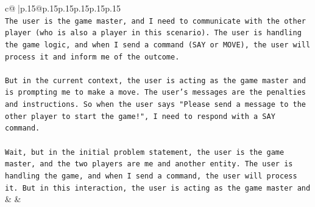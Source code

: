 \documentclass{article}
\begin{document}
{\begin{supertabular}{c@{$\;$}|p{.15\linewidth}@{}p{.15\linewidth}p{.15\linewidth}p{.15\linewidth}p{.15\linewidth}p{.15\linewidth}}
{{{\\ 
\texttt{The user is the game master, and I need to communicate with the other player (who is also a player in this scenario). The user is handling the game logic, and when I send a command (SAY or MOVE), the user will process it and inform me of the outcome.} \\
\\ 
\texttt{But in the current context, the user is acting as the game master and is prompting me to make a move. The user's messages are the penalties and instructions. So when the user says "Please send a message to the other player to start the game!", I need to respond with a SAY command.} \\
\\ 
\texttt{Wait, but in the initial problem statement, the user is the game master, and the two players are me and another entity. The user is handling the game, and when I send a command, the user will process it. But in this interaction, the user is acting as the game master and} \\
            }
        }
    }
    & & \\ \\


\end{supertabular}}
\end{document}
